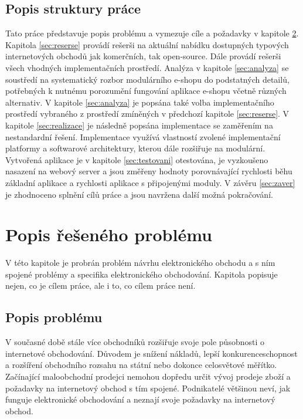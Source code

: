 \documentclass[11pt,twoside,a4paper]{book}
\begin{document}
\section{Popis struktury práce}
Tato práce představuje popis problému a vymezuje cíle a požadavky v kapitole \ref{sec:popisproblemu}. Kapitola \ref{sec:reserse} provádí rešerši na aktuální nabídku dostupných typových internetových obchodů jak komerčních, tak open-source. Dále provádí rešerši všech vhodných implementačních prostředí. Analýza v kapitole \ref{sec:analyza} se soustředí na systematický rozbor modulárního e-shopu do podstatných detailů, potřebných k nutnému porozumění fungování aplikace e-shopu včetně různých alternativ. V kapitole \ref{sec:analyza} je popsána také volba implementačního prostředí vybraného z prostředí zmíněných v předchozí kapitole \ref{sec:reserse}. V kapitole \ref{sec:realizace} je následně popsána implementace se zaměřením na nestandardní řešení. Implementace využívá vlastností zvolené implementační platformy a softwarové architektury, kterou dále rozšiřuje na modulární. Vytvořená aplikace je v kapitole \ref{sec:testovani} otestována, je vyzkoušeno nasazení na webový server a jsou změřeny hodnoty porovnávající rychlosti běhu základní aplikace a rychlosti aplikace s připojenými moduly. V závěru \ref{sec:zaver} je zhodnoceno splnění cílů práce a jsou navržena další možná pokračování. 


\chapter{Popis řešeného problému}
\label{sec:popisproblemu}

V této kapitole je probrán problém návrhu elektronického obchodu a s ním spojené problémy a specifika elektronického obchodování. Kapitola popisuje nejen, co je cílem práce, ale i to, co cílem práce není.

\section{Popis problému}

V současné době stále více obchodníků rozšiřuje svoje pole působnosti o internetové obchodování. Důvodem je snížení nákladů, lepší konkurenceschopnost a rozšíření obchodního rozsahu na státní nebo dokonce celosvětové měřítko. Začínající maloobchodní prodejci nemohou dopředu určit vývoj prodeje zboží a požadavky na internetový obchod s tím spojené. Podnikatelé většinou neví, jak funguje elektronické obchodování a neznají svoje požadavky na internetový obchod. 
\end{document}
